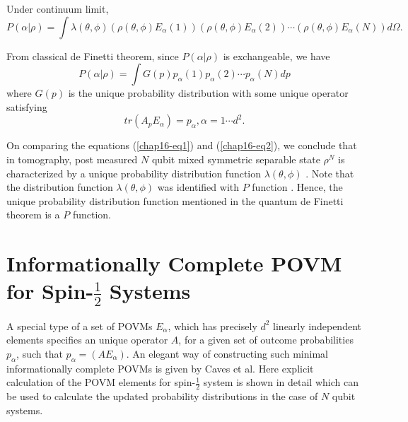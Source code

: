 Under continuum limit,
\makeatletter
{}
\makeatother
\begin{equation} 
P(\alpha|\rho) = \int \lambda(\theta,\phi) (\rho(\theta,\phi) E_{\alpha}(1)) (\rho (\theta,\phi) E_{\alpha}(2)) \cdots (\rho (\theta,\phi) E_{\alpha}(N)) d\Omega. \label{chap16-eq1}
\end{equation}

From classical de Finetti theorem, since $P(\alpha|\rho)$ is exchangeable\cite{chap16-key10}, we have 
\begin{equation} 
P(\alpha|\rho) = \int G(p) p_{\alpha}(1) p_{\alpha}(2) \cdots p_{\alpha}(N) dp \label{chap16-eq2}
\end{equation} 
where $G(p)$ is the unique probability distribution with some unique operator satisfying 
$$
tr(A_{p}E_{\alpha}) = p_{\alpha}, \alpha= 1 \cdots d^{2}.
$$

On comparing the equations (\eqref{chap16-eq1}) and (\eqref{chap16-eq2}), we conclude that in tomography, post measured $N$ qubit mixed symmetric separable state $\rho^{N}$ is characterized by a unique probability distribution function $\lambda(\theta,\phi)$ \cite{chap16-key11}. Note that the distribution function $\lambda(\theta,\phi)$ was identified with $P$ function \cite{chap16-key12}. Hence, the unique probability distribution function mentioned in the quantum de Finetti theorem is a $P$ function.

\section{Informationally Complete POVM for Spin-$\frac{1}{2}$ Systems}\label{chap16-sec6}

A special type of a set of POVMs\cite{chap16-key8} $E_{\alpha}$, which has precisely $d^{2}$ linearly independent elements specifies an unique operator $A$, for a given set of outcome probabilities $p_{\alpha}$, such that $p_{\alpha}= (AE_{\alpha})$. An elegant way of constructing such minimal informationally complete POVMs is given by Caves et al\cite{chap16-key8}. Here explicit calculation of the POVM elements for spin-$\frac{1}{2}$ system is shown in detail which can be used to calculate the updated probability distributions in the case of $N$ qubit systems.

